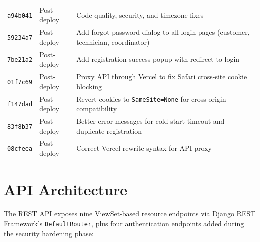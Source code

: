 \documentclass[conference]{IEEEtran}
\begin{document}
\begin{table}[t]
\begin{tabular}{@{}p{1.2cm}p{1.8cm}p{11.5cm}@{}}
\texttt{a94b041} & Post-deploy & Code quality, security, and timezone fixes \\
\texttt{59234a7} & Post-deploy & Add forgot password dialog to all login pages (customer, technician, coordinator) \\
\texttt{7be21a2} & Post-deploy & Add registration success popup with redirect to login \\
\texttt{01f7c69} & Post-deploy & Proxy API through Vercel to fix Safari cross-site cookie blocking \\
\texttt{f147dad} & Post-deploy & Revert cookies to \texttt{SameSite=None} for cross-origin compatibility \\
\texttt{83f8b37} & Post-deploy & Better error messages for cold start timeout and duplicate registration \\
\texttt{08cfeea} & Post-deploy & Correct Vercel rewrite syntax for API proxy \\
\bottomrule
\end{tabular}
\end{table}

\section{API Architecture}

The REST API exposes nine ViewSet-based resource endpoints via Django REST Framework's \texttt{DefaultRouter}, plus four authentication endpoints added during the security hardening phase:
\end{document}
